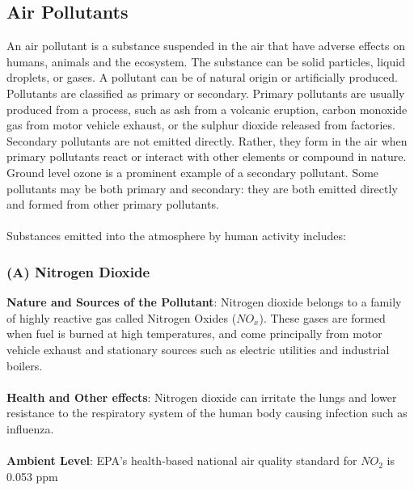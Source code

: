 \subsection{Air Pollutants}
An air pollutant is a substance suspended in the air that have adverse effects on humans, animals and the ecosystem. The substance can be solid particles, liquid droplets, or gases. A pollutant can be of natural origin or artificially produced. Pollutants are classified as primary or secondary. Primary pollutants are usually produced from a process, such as ash from a volcanic eruption, carbon monoxide gas from motor vehicle exhaust, or the sulphur dioxide released from factories. Secondary pollutants are not emitted directly. Rather, they form in the air when primary pollutants react or interact with other elements or compound in nature. Ground level ozone is a prominent example of a secondary pollutant. Some pollutants may be both primary and secondary: they are both emitted directly and formed from other primary pollutants.
\\
\\
Substances emitted into the atmosphere by human activity includes:
\subsubsection{(A) Nitrogen Dioxide}
\textbf{Nature and Sources of the Pollutant}: Nitrogen dioxide belongs to a family of highly reactive gas called Nitrogen Oxides ($NO_x$). These gases are formed when fuel is burned at high temperatures, and come principally from motor vehicle exhaust and stationary sources such as electric utilities and industrial boilers.
\\
\\
\textbf{Health and Other effects}: Nitrogen dioxide can irritate the lungs and lower resistance to the respiratory system of the human body causing infection such as influenza.
\\
\\
\textbf{Ambient Level}: EPA's health-based national air quality standard for $NO_2$ is 0.053 ppm

